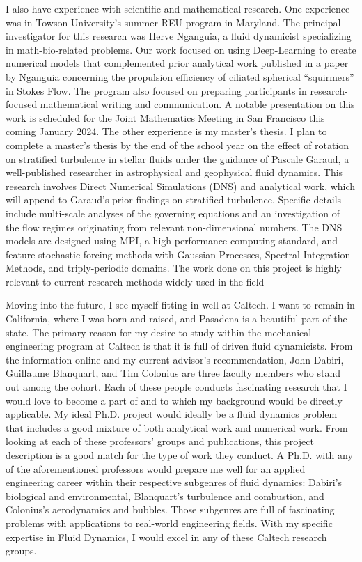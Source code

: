 \documentclass{article}
\begin{document}
I also have experience with scientific and mathematical research. One experience was in Towson University's summer REU program in Maryland. The principal investigator for this research was Herve Nganguia, a fluid dynamicist specializing in math-bio-related problems. Our work focused on using Deep-Learning to create numerical models that complemented prior analytical work published in a paper by Nganguia concerning the propulsion efficiency of ciliated spherical ``squirmers'' in Stokes Flow. The program also focused on preparing participants in research-focused mathematical writing and communication. A notable presentation on this work is scheduled for the Joint Mathematics Meeting in San Francisco this coming January 2024. The other experience is my master's thesis. I plan to complete a master's thesis by the end of the school year on the effect of rotation on stratified turbulence in stellar fluids under the guidance of Pascale Garaud, a well-published researcher in astrophysical and geophysical fluid dynamics. This research involves Direct Numerical Simulations (DNS) and analytical work, which will append to Garaud's prior findings on stratified turbulence. Specific details include multi-scale analyses of the governing equations and an investigation of the flow regimes originating from relevant non-dimensional numbers. The DNS models are designed using MPI, a high-performance computing standard, and feature stochastic forcing methods with Gaussian Processes, Spectral Integration Methods, and triply-periodic domains. The work done on this project is highly relevant to current research methods widely used in the field

Moving into the future, I see myself fitting in well at Caltech. I want to remain in California, where I was born and raised, and Pasadena is a beautiful part of the state. The primary reason for my desire to study within the mechanical engineering program at Caltech is that it is full of driven fluid dynamicists. From the information online and my current advisor's recommendation, John Dabiri, Guillaume Blanquart, and Tim Colonius are three faculty members who stand out among the cohort. Each of these people conducts fascinating research that I would love to become a part of and to which my background would be directly applicable. My ideal Ph.D. project would ideally be a fluid dynamics problem that includes a good mixture of both analytical work and numerical work. From looking at each of these professors' groups and publications, this project description is a good match for the type of work they conduct. A Ph.D. with any of the aforementioned professors would prepare me well for an applied engineering career within their respective subgenres of fluid dynamics: Dabiri's biological and environmental, Blanquart's turbulence and combustion, and Colonius's aerodynamics and bubbles. Those subgenres are full of fascinating problems with applications to real-world engineering fields. With my specific expertise in Fluid Dynamics, I would excel in any of these Caltech research groups. 
\end{document}
